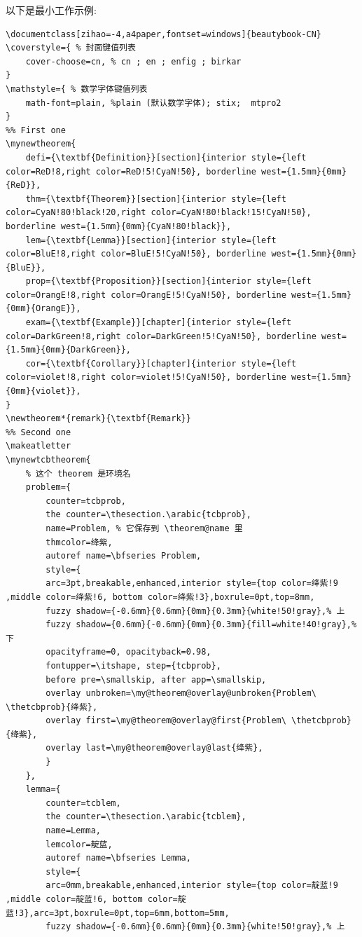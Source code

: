 \documentclass[lang=cn,zihao=-4,a4paper,fontset=windows]{beautybook}
\begin{document}
以下是最小工作示例:
\begin{lstlisting}
\documentclass[zihao=-4,a4paper,fontset=windows]{beautybook-CN}
\coverstyle={ % 封面键值列表
    cover-choose=cn, % cn ; en ; enfig ; birkar
}
\mathstyle={ % 数学字体键值列表
    math-font=plain, %plain (默认数学字体); stix;  mtpro2
}
%% First one
\mynewtheorem{
    defi={\textbf{Definition}}[section]{interior style={left color=ReD!8,right color=ReD!5!CyaN!50}, borderline west={1.5mm}{0mm}{ReD}},
    thm={\textbf{Theorem}}[section]{interior style={left color=CyaN!80!black!20,right color=CyaN!80!black!15!CyaN!50}, borderline west={1.5mm}{0mm}{CyaN!80!black}},
    lem={\textbf{Lemma}}[section]{interior style={left color=BluE!8,right color=BluE!5!CyaN!50}, borderline west={1.5mm}{0mm}{BluE}},
    prop={\textbf{Proposition}}[section]{interior style={left color=OrangE!8,right color=OrangE!5!CyaN!50}, borderline west={1.5mm}{0mm}{OrangE}},
    exam={\textbf{Example}}[chapter]{interior style={left color=DarkGreen!8,right color=DarkGreen!5!CyaN!50}, borderline west={1.5mm}{0mm}{DarkGreen}},
    cor={\textbf{Corollary}}[chapter]{interior style={left color=violet!8,right color=violet!5!CyaN!50}, borderline west={1.5mm}{0mm}{violet}},
}
\newtheorem*{remark}{\textbf{Remark}}
%% Second one
\makeatletter
\mynewtcbtheorem{
    % 这个 theorem 是环境名
    problem={
        counter=tcbprob, 
        the counter=\thesection.\arabic{tcbprob}, 
        name=Problem, % 它保存到 \theorem@name 里
        thmcolor=绛紫,
        autoref name=\bfseries Problem, 
        style={
        arc=3pt,breakable,enhanced,interior style={top color=绛紫!9 ,middle color=绛紫!6, bottom color=绛紫!3},boxrule=0pt,top=8mm,
        fuzzy shadow={-0.6mm}{0.6mm}{0mm}{0.3mm}{white!50!gray},% 上
        fuzzy shadow={0.6mm}{-0.6mm}{0mm}{0.3mm}{fill=white!40!gray},%下
        opacityframe=0, opacityback=0.98,
        fontupper=\itshape, step={tcbprob},
        before pre=\smallskip, after app=\smallskip,
        overlay unbroken=\my@theorem@overlay@unbroken{Problem\ \thetcbprob}{绛紫},
        overlay first=\my@theorem@overlay@first{Problem\ \thetcbprob}{绛紫},
        overlay last=\my@theorem@overlay@last{绛紫},
        }
    },
    lemma={
        counter=tcblem,
        the counter=\thesection.\arabic{tcblem},
        name=Lemma, 
        lemcolor=靛蓝, 
        autoref name=\bfseries Lemma,
        style={
        arc=0mm,breakable,enhanced,interior style={top color=靛蓝!9 ,middle color=靛蓝!6, bottom color=靛蓝!3},arc=3pt,boxrule=0pt,top=6mm,bottom=5mm,
        fuzzy shadow={-0.6mm}{0.6mm}{0mm}{0.3mm}{white!50!gray},% 上

\end{lstlisting}
\end{document}
